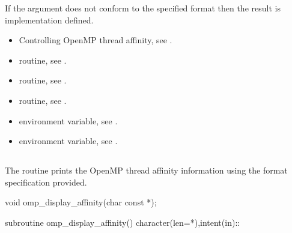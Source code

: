 If the  argument does not conform to the specified format
then the result is implementation defined.

\crossreferences
\begin{itemize}
\item Controlling OpenMP thread affinity, see
.

\item {} routine, 
see .

\item {} routine, see .

\item {} routine, see .

\item {} environment variable, see
.

\item {} environment variable, see
.
\end{itemize}



\subsection{}
\label{subsec:omp_display_affinity}

\summary
The  routine prints the OpenMP thread 
affinity information using the format specification provided.

\format
\begin{ccppspecific}
\begin{ompcFunction}
void omp_display_affinity(char const *);
\end{ompcFunction}
\end{ccppspecific}


\begin{fortranspecific}
\begin{ompfSubroutine}
subroutine omp_display_affinity()
character(len=*),intent(in)::
\end{ompfSubroutine}
\end{fortranspecific}

